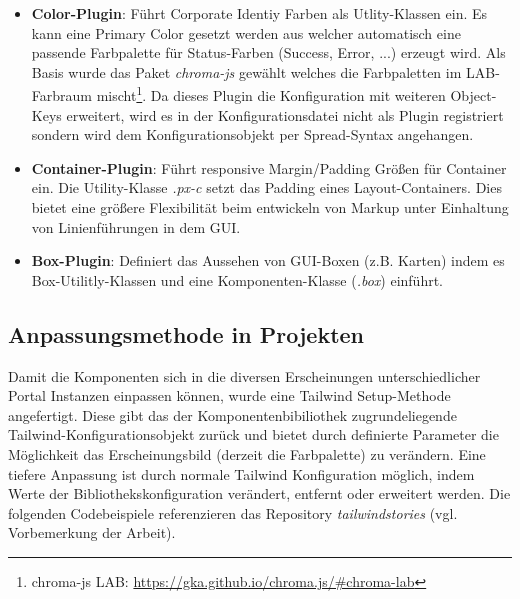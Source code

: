 \begin{itemize}
  \item \textbf{Color-Plugin}: Führt Corporate Identiy Farben als Utlity-Klassen ein. Es kann eine Primary Color gesetzt werden aus welcher automatisch eine passende Farbpalette für Status-Farben (Success, Error, ...) erzeugt wird. Als Basis wurde das Paket \textit{chroma-js} gewählt welches die Farbpaletten im LAB-Farbraum mischt\footnote{chroma-js LAB: \url{https://gka.github.io/chroma.js/\#chroma-lab}}. Da dieses Plugin die Konfiguration mit weiteren Object-Keys erweitert, wird es in der Konfigurationsdatei nicht als Plugin registriert sondern wird dem Konfigurationsobjekt per Spread-Syntax angehangen.
  \item \textbf{Container-Plugin}: Führt responsive Margin/Padding Größen für Container ein. Die Utility-Klasse \textit{.px-c} setzt das Padding eines Layout-Containers. Dies bietet eine größere Flexibilität beim entwickeln von Markup unter Einhaltung von Linienführungen in dem GUI.
  \item \textbf{Box-Plugin}: Definiert das Aussehen von GUI-Boxen (z.B. Karten) indem es Box-Utilitly-Klassen und eine Komponenten-Klasse (\textit{.box}) einführt.
\end{itemize}

\subsection{Anpassungsmethode in Projekten}
\label{sec:ProjectCustomisation}

Damit die Komponenten sich in die diversen Erscheinungen unterschiedlicher Portal Instanzen einpassen können, wurde eine Tailwind Setup-Methode angefertigt. Diese gibt das der Komponentenbibiliothek zugrundeliegende Tailwind-Konfigurationsobjekt zurück und bietet durch definierte Parameter die Möglichkeit das Erscheinungsbild (derzeit die Farbpalette) zu verändern. Eine tiefere Anpassung ist durch normale Tailwind Konfiguration möglich, indem Werte der Bibliothekskonfiguration verändert, entfernt oder erweitert werden. Die folgenden Codebeispiele referenzieren das Repository \textit{tailwindstories} (vgl. Vorbemerkung der Arbeit).





